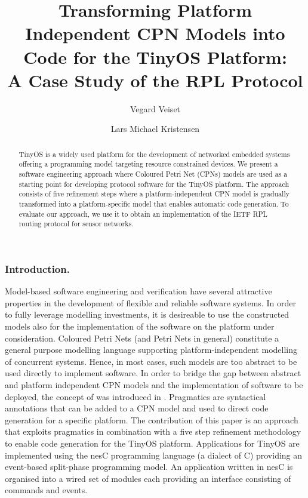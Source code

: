 \documentclass{llncs}
\title{Transforming Platform Independent CPN Models into Code for the TinyOS
  Platform: \\ A Case Study of the RPL Protocol}
\author{
  Vegard Veiset \and Lars Michael Kristensen
}
\institute{
  Department of Computing, Bergen University College \\
  Email: \email{vegard.veiset@stud.hib.no,lmkr@hib.no}
}
\begin{document}
\maketitle

\begin{abstract}

TinyOS is a widely used platform for the development of networked
embedded systems offering a programming model targeting resource
constrained devices. We present a software engineering approach where
Coloured Petri Net (CPNs) models are used as a starting point for
developing protocol software for the TinyOS platform. The approach
consists of five refinement steps where a platform-independent CPN
model is gradually transformed into a platform-specific model that
enables automatic code generation. To evaluate our approach, we use it
to obtain an implementation of the IETF RPL routing protocol for
sensor networks.


\end{abstract}

\subsubsection{Introduction.} Model-based software engineering and verification  have several attractive properties in the development of flexible and reliable
software systems. In order to fully leverage modelling investments, it
is desireable to use the constructed models also for the
implementation of the software on the platform under
consideration. Coloured Petri Nets \cite{CPNsttt} (and Petri Nets in
general) constitute a general purpose modelling language supporting
platform-independent modelling of concurrent systems. Hence, in most
cases, such models are too abstract to be used directly to implement
software. In order to bridge the gap between abstract and platform
independent CPN models and the implementation of software to be
deployed, the concept of  was introduced in
\cite{NWPTpaper}. Pragmatics are syntactical annotations that can be
added to a CPN model and used to direct code generation for a specific
platform. The contribution of this paper is an approach
\cite{veisetthesis} that exploits pragmatics in combination with a
five step refinement methodology to enable code generation for the
TinyOS platform. Applications for TinyOS \cite{LevisTinyOS} are
implemented using the nesC programming language (a dialect of C)
providing an event-based split-phase programming model. An application
written in nesC is organised into a wired set of modules each
providing an interface consisting of commands and events.
\end{document}
